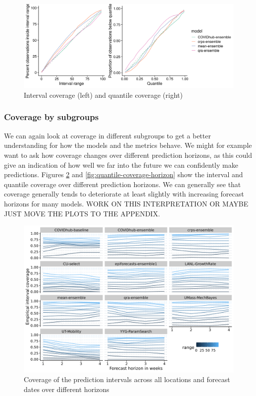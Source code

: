 \documentclass[
]{book}
\begin{document}
\begin{figure}
\includegraphics[width=1\linewidth]{../visualisation/chapter-5-results/coverage_ensemble} \caption{Interval coverage (left) and quantile coverage (right)}\label{fig:coverage-ensemble}
\end{figure}

\hypertarget{coverage-by-subgroups}{%
\subsubsection{Coverage by subgroups}\label{coverage-by-subgroups}}

We can again look at coverage in different subgroups to get a better understanding for how the models and the metrics behave. We might for example want to ask how coverage changes over different prediction horizons, as this could give an indication of how well we far into the future we can confidently make predictions. Figures \ref{fig:interval-coverage-horizon} and \ref{fig:quantile-coverage-horizon} show the interval and quantile coverage over different prediction horizons. We can generally see that coverage generally tends to deteriorate at least slightly with increasing forecast horizons for many models. WORK ON THIS INTERPRETATION OR MAYBE JUST MOVE THE PLOTS TO THE APPENDIX.

\begin{figure}
\includegraphics[width=1\linewidth]{../visualisation/chapter-5-results/interval-coverage-horizons} \caption{Coverage of the prediction intervals across all locations and forecast dates over different horizons}\label{fig:interval-coverage-horizon}
\end{figure}
\end{document}
